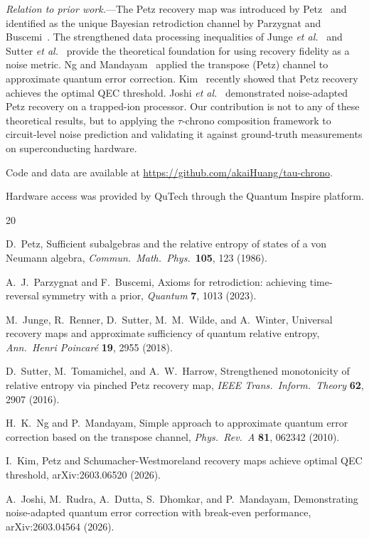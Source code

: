 \documentclass[prl,twocolumn,superscriptaddress,longbibliography]{revtex4-2}
\begin{document}
\emph{Relation to prior work.}---The Petz recovery map was introduced by Petz~\cite{Petz1986} and identified as the unique Bayesian retrodiction channel by Parzygnat and Buscemi~\cite{Parzygnat2023}. The strengthened data processing inequalities of Junge \emph{et al.}~\cite{Junge2018} and Sutter \emph{et al.}~\cite{Sutter2016} provide the theoretical foundation for using recovery fidelity as a noise metric. Ng and Mandayam~\cite{NgMandayam2010} applied the transpose (Petz) channel to approximate quantum error correction. Kim~\cite{Kim2026} recently showed that Petz recovery achieves the optimal QEC threshold. Joshi \emph{et al.}~\cite{Joshi2026} demonstrated noise-adapted Petz recovery on a trapped-ion processor. Our contribution is not to any of these theoretical results, but to applying the $\tau$-chrono composition framework to circuit-level noise prediction and validating it against ground-truth measurements on superconducting hardware.

Code and data are available at \url{https://github.com/akaiHuang/tau-chrono}.

\begin{acknowledgments}
Hardware access was provided by QuTech through the Quantum Inspire platform.
\end{acknowledgments}

\begin{thebibliography}{20}

D.~Petz,
Sufficient subalgebras and the relative entropy of states of a von Neumann algebra,
\emph{Commun.\ Math.\ Phys.}\ \textbf{105}, 123 (1986).

A.~J.~Parzygnat and F.~Buscemi,
Axioms for retrodiction: achieving time-reversal symmetry with a prior,
\emph{Quantum} \textbf{7}, 1013 (2023).

M.~Junge, R.~Renner, D.~Sutter, M.~M.~Wilde, and A.~Winter,
Universal recovery maps and approximate sufficiency of quantum relative entropy,
\emph{Ann.\ Henri Poincar\'{e}} \textbf{19}, 2955 (2018).

D.~Sutter, M.~Tomamichel, and A.~W.~Harrow,
Strengthened monotonicity of relative entropy via pinched Petz recovery map,
\emph{IEEE Trans.\ Inform.\ Theory} \textbf{62}, 2907 (2016).

H.~K.~Ng and P.~Mandayam,
Simple approach to approximate quantum error correction based on the transpose channel,
\emph{Phys.\ Rev.\ A} \textbf{81}, 062342 (2010).

I.~Kim,
Petz and Schumacher-Westmoreland recovery maps achieve optimal QEC threshold,
arXiv:2603.06520 (2026).

A.~Joshi, M.~Rudra, A.~Dutta, S.~Dhomkar, and P.~Mandayam,
Demonstrating noise-adapted quantum error correction with break-even performance,
arXiv:2603.04564 (2026).

\end{thebibliography}
\end{document}
